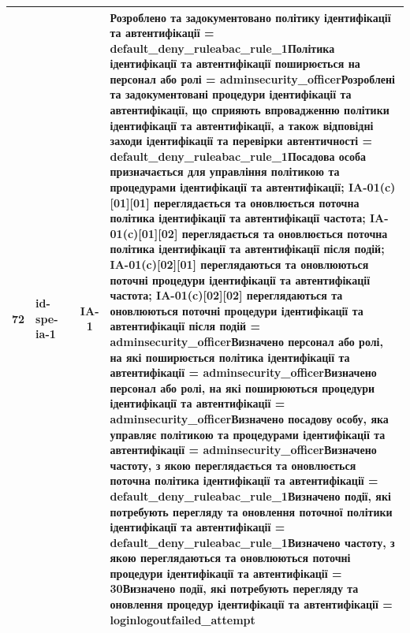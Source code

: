 \documentclass[10pt]{article}
\begin{document}
\begin{longtable}{|c|>{\raggedright\arraybackslash}p{2.5cm}|>{\raggedright\arraybackslash}p{4.5cm}|c|>{\raggedright\arraybackslash}p{4.5cm}|}
72 & id-spe-ia-1 &  & IA-1 & Розроблено та задокументовано політику ідентифікації та автентифікації = \textbf{default\_\allowbreak{}deny\_\allowbreak{}ruleabac\_\allowbreak{}rule\_\allowbreak{}1}\newline Політика ідентифікації та автентифікації поширюється на персонал або ролі = \textbf{adminsecurity\_\allowbreak{}officer}\newline Розроблені та задокументовані процедури ідентифікації та автентифікації, що сприяють впровадженню політики ідентифікації та автентифікації, а також відповідні заходи ідентифікації та перевірки автентичності = \textbf{default\_\allowbreak{}deny\_\allowbreak{}ruleabac\_\allowbreak{}rule\_\allowbreak{}1}\newline Посадова особа призначається для управління політикою та процедурами ідентифікації та автентифікації; IA-01(c)[01][01] переглядається та оновлюється поточна політика ідентифікації та автентифікації частота; IA-01(c)[01][02] переглядається та оновлюється поточна політика ідентифікації та автентифікації після подій; IA-01(c)[02][01] переглядаються та оновлюються поточні процедури ідентифікації та автентифікації частота; IA-01(c)[02][02] переглядаються та оновлюються поточні процедури ідентифікації та автентифікації після подій = \textbf{adminsecurity\_\allowbreak{}officer}\newline Визначено персонал або ролі, на які поширюється політика ідентифікації та автентифікації = \textbf{adminsecurity\_\allowbreak{}officer}\newline Визначено персонал або ролі, на які поширюються процедури ідентифікації та автентифікації = \textbf{adminsecurity\_\allowbreak{}officer}\newline Визначено посадову особу, яка управляє політикою та процедурами ідентифікації та автентифікації = \textbf{adminsecurity\_\allowbreak{}officer}\newline Визначено частоту, з якою переглядається та оновлюється поточна політика ідентифікації та автентифікації = \textbf{default\_\allowbreak{}deny\_\allowbreak{}ruleabac\_\allowbreak{}rule\_\allowbreak{}1}\newline Визначено події, які потребують перегляду та оновлення поточної політики ідентифікації та автентифікації = \textbf{default\_\allowbreak{}deny\_\allowbreak{}ruleabac\_\allowbreak{}rule\_\allowbreak{}1}\newline Визначено частоту, з якою переглядаються та оновлюються поточні процедури ідентифікації та автентифікації = \textbf{30}\newline Визначено події, які потребують перегляду та оновлення процедур ідентифікації та автентифікації = \textbf{loginlogoutfailed\_\allowbreak{}attempt} \\ \hline

\end{longtable}
\end{document}
